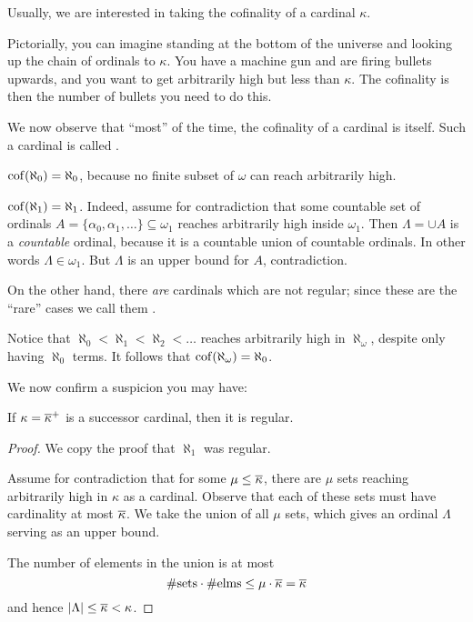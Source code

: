 Usually, we are interested in taking the cofinality of a cardinal $\kappa$.

Pictorially, you can imagine standing at the bottom of the universe and looking
up the chain of ordinals to $\kappa$.
You have a machine gun and are firing bullets upwards, and you want to get arbitrarily
high but less than $\kappa$.
The cofinality is then the number of bullets you need to do this.

We now observe that ``most'' of the time, the cofinality of a cardinal is itself.
Such a cardinal is called .
\begin{example}
	$\operatorname{cof}(\aleph_0) = \aleph_0$, because no finite subset of $\omega$ can reach arbitrarily high.
\end{example}
\begin{example}
	$\operatorname{cof}(\aleph_1) = \aleph_1$.
	Indeed, assume for contradiction that some countable
	set of ordinals $A = \{ \alpha_0, \alpha_1, \dots \} \subseteq \omega_1$
	reaches arbitrarily high inside $\omega_1$.
	Then $\Lambda = \cup A$ is a \emph{countable} ordinal,
	because it is a countable union of countable ordinals.
	In other words $\Lambda \in \omega_1$.
	But $\Lambda$ is an upper bound for $A$, contradiction.
\end{example}
On the other hand, there \emph{are} cardinals which are not regular;
since these are the ``rare'' cases we call them .
\begin{example}
	Notice that $\aleph_0 < \aleph_1 < \aleph_2 < \dots$ reaches
	arbitrarily high in $\aleph_\omega$, despite only having $\aleph_0$ terms.
	It follows that $\operatorname{cof}(\aleph_\omega) = \aleph_0$.
\end{example}

We now confirm a suspicion you may have:
\begin{theorem}
	If $\kappa = \overline\kappa^+$ is a successor cardinal,
	then it is regular.
\end{theorem}
\begin{proof}
	We copy the proof that $\aleph_1$ was regular.

	Assume for contradiction that for some $\mu \le \overline\kappa$,
	there are $\mu$ sets reaching arbitrarily high in $\kappa$ as a cardinal.
	Observe that each of these sets must have cardinality at most $\overline\kappa$.
	We take the union of all $\mu$ sets, which gives an ordinal $\Lambda$
	serving as an upper bound.

	The number of elements in the union is at most
	\[ \#\text{sets} \cdot \#\text{elms}
		\le \mu \cdot \overline\kappa = \overline\kappa \]
	and hence $\left\lvert \Lambda \right\rvert \le \overline\kappa < \kappa$.
\end{proof}

